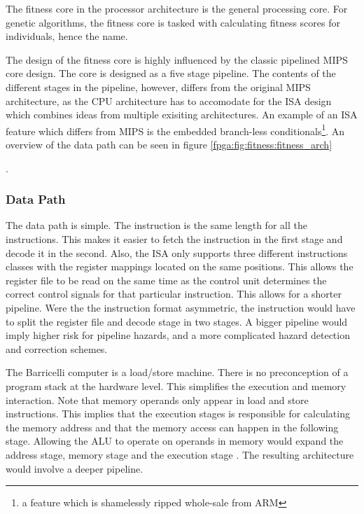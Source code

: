 The fitness core in the processor architecture is the general processing core.
For genetic algorithms, the fitness core is tasked with calculating fitness scores for individuals, hence the name.

The design of the fitness core is highly influenced by the classic pipelined \gls{MIPS} core design\cn.
The core is designed as a five stage pipeline.
The contents of the different stages in the pipeline, however, differs from the original \gls{MIPS} architecture, as the CPU architecture has to accomodate for the \gls{ISA} design which combines ideas from multiple exisiting architectures.
An example of an \gls{ISA} feature which differs from \gls{MIPS} is the embedded branch-less conditionals\footnote{a feature which is shamelessly ripped whole-sale from ARM}.
An overview of the data path can be seen in figure \vref{fpga:fig:fitness:fitness_arch}

.

\newpage
\subsubsection{Data Path} 

The data path is simple.
The instruction is the same length for all the instructions.
This makes it easier to fetch the instruction in the first stage and decode it in the second.
Also, the ISA only supports three different instructions classes with the register mappings located on the same positions.
This allows the register file to be read on the same time as the control unit determines the correct control signals for that particular instruction.
This allows for a shorter pipeline.
Were the the instruction format asymmetric, the instruction would have to split the register file and decode stage in two stages.
A bigger pipeline would imply higher risk for pipeline hazards, and a more complicated hazard detection and correction schemes. 

The Barricelli computer is a load/store machine.
There is no preconception of a program stack at the hardware level.
This simplifies the execution and memory interaction.
Note that memory operands only appear in load and store instructions.
This implies that the execution stages is responsible for calculating the memory address and that the memory access can happen in the following stage.
Allowing the ALU to operate on operands in memory would expand the address stage, memory stage and the execution stage \cite[p.~335]{compOrgDes}.
The resulting architecture would involve a deeper pipeline. 


